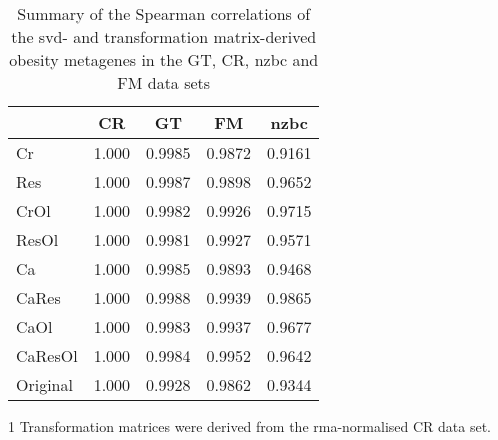 \begin{table}[htpb]
	\centering
	\begin{threeparttable}
	\caption[Summary of the Spearman correlations of the \gls{svd}- and TM-derived obesity metagenes in the GT, CR, \gls{nzbc} and FM data sets]{Summary of the Spearman correlations of the \gls{svd}- and transformation matrix-derived obesity metagenes in the GT, CR, \gls{nzbc} and FM data sets}
		\label{tab:svd_vs_tm_obs}
		\begin{tabular}{lcccc}
			& CR & GT & FM & \gls{nzbc}\\
			\hline
			\hline
			\rule{0pt}{2.25ex} Cr & 1.000     & 0.9985 & 0.9872 & 0.9161 \\
			Res                   & 1.000     & 0.9987 & 0.9898 & 0.9652 \\
			CrOl                  & 1.000     & 0.9982 & 0.9926 & 0.9715 \\
			ResOl                 & 1.000     & 0.9981 & 0.9927 & 0.9571 \\
			Ca                    & 1.000     & 0.9985 & 0.9893 & 0.9468 \\
			CaRes                 & 1.000     & 0.9988 & 0.9939 & 0.9865 \\
			CaOl                  & 1.000     & 0.9983 & 0.9937 & 0.9677 \\
			CaResOl               & 1.000     & 0.9984 & 0.9952 & 0.9642 \\
			Original              & 1.000     & 0.9928 & 0.9862 & 0.9344 \\
			\hline
			\hline
		\end{tabular}
			\begin{tablenotes}
				\begin{footnotesize}
				\item [1] Transformation matrices were derived from the \gls{rma}-normalised CR data set.
				\end{footnotesize}
			\end{tablenotes}
	\end{threeparttable}
\end{table}


